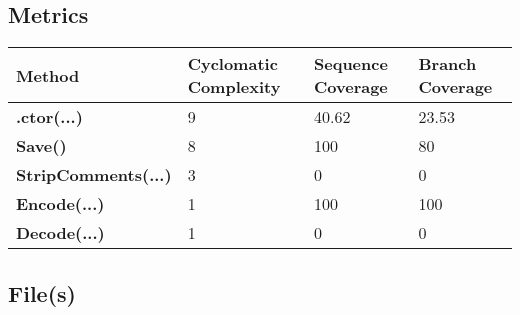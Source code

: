 \documentclass[a4paper,10pt]{article}
\begin{document}
\subsection{Metrics}
\begin{longtable}[l]{|l|l|l|l|}
\hline
\textbf{Method} & \textbf{Cyclomatic Complexity} & \textbf{Sequence Coverage} & \textbf{Branch Coverage}\\
\hline
\textbf{.ctor(...)} & 9 & 40.62 & 23.53\\
\hline
\textbf{Save()} & 8 & 100 & 80\\
\hline
\textbf{StripComments(...)} & 3 & 0 & 0\\
\hline
\textbf{Encode(...)} & 1 & 100 & 100\\
\hline
\textbf{Decode(...)} & 1 & 0 & 0\\
\hline
\end{longtable}
\subsection{File(s)}
\end{document}
